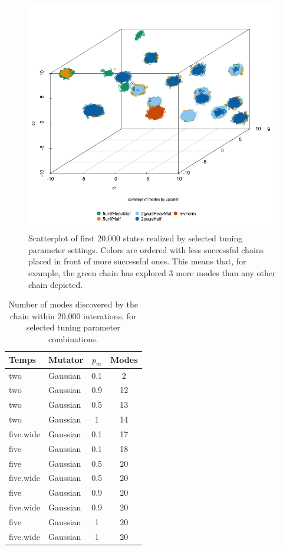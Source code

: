 \documentclass[12pt]{article}\usepackage[]{graphicx}\usepackage[]{color}
\begin{document}
\begin{figure}
  \centering
  \caption{Scatterplot of first 20,000 states realized by selected tuning parameter
    settings. Colors are ordered with less successful chains placed in
  front of more successful ones. This means that, for example, the
  green chain has explored 3 more modes than any other chain depicted.} 
  \label{scatterplot}
  \includegraphics[width=\textwidth]{figure/final_plot.png}
\end{figure}


\begin{table}
  \centering
  \begin{tabular}{llcc}
    \hline\hline
    Temps & Mutator & $p_m$ & Modes \\ 
    \hline
    two & Gaussian & 0.1 & 2 \\ 
    two & Gaussian & 0.9 & 12 \\ 
    two & Gaussian & 0.5 & 13 \\ 
    two & Gaussian & 1 & 14 \\ 
    five.wide & Gaussian & 0.1 & 17 \\ 
    five & Gaussian & 0.1 & 18 \\ 
    five & Gaussian & 0.5 & 20 \\ 
    five.wide & Gaussian & 0.5 & 20 \\ 
    five & Gaussian & 0.9 & 20 \\ 
    five.wide & Gaussian & 0.9 & 20 \\ 
    five & Gaussian & 1 & 20 \\ 
    five.wide & Gaussian & 1 & 20 \\ 
    \hline\hline
  \end{tabular}
    \caption{Number of modes discovered by the chain within 20,000 interations, for selected tuning parameter combinations.}
  \label{table}
\end{table}
\end{document}
